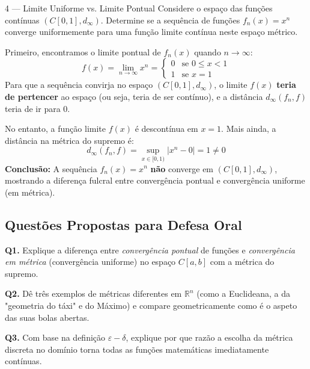 \begin{exercisebox}{4 --- Limite Uniforme vs. Limite Pontual}
  Considere o espaço das funções contínuas $(C[0,1], d_\infty)$. Determine se a sequência de funções $f_n(x)=x^n$ converge uniformemente para uma função limite contínua neste espaço métrico.
\end{exercisebox}
\begin{solbox}
  Primeiro, encontramos o limite pontual de $f_n(x)$ quando $n \to \infty$:
  \[
    f(x) = \lim_{n\to\infty} x^n = 
    \begin{cases} 
      0 & \text{se } 0 \le x < 1 \\ 
      1 & \text{se } x = 1 
    \end{cases}
  \]
  Para que a sequência convirja no espaço $(C[0,1], d_\infty)$, o limite $f(x)$ \textbf{teria de pertencer} ao espaço (ou seja, teria de ser contínuo), e a distância $d_\infty(f_n, f)$ teria de ir para $0$.
  
  No entanto, a função limite $f(x)$ é descontínua em $x=1$. Mais ainda, a distância na métrica do supremo é:
  \[
    d_\infty(f_n, f) = \sup_{x \in [0,1)} |x^n - 0| = 1 \neq 0
  \]
  \textbf{Conclusão:} A sequência $f_n(x) = x^n$ \textbf{não} converge em $(C[0,1], d_\infty)$, mostrando a diferença fulcral entre convergência pontual e convergência uniforme (em métrica).
\end{solbox}

\subsection{Questões Propostas para Defesa Oral}

\begin{oralbox}
  \textbf{Q1.} Explique a diferença entre \emph{convergência pontual} de funções e \emph{convergência em métrica} (convergência uniforme) no espaço $C[a,b]$ com a métrica do supremo.
\end{oralbox}

\begin{oralbox}
  \textbf{Q2.} Dê três exemplos de métricas diferentes em $\mathbb{R}^n$ (como a Euclideana, a da "geometria do táxi" e do Máximo) e compare geometricamente como é o aspeto das suas bolas abertas.
\end{oralbox}

\begin{oralbox}
  \textbf{Q3.} Com base na definição $\varepsilon-\delta$, explique por que razão a escolha da métrica discreta no domínio torna todas as funções matemáticas imediatamente contínuas.
\end{oralbox}

